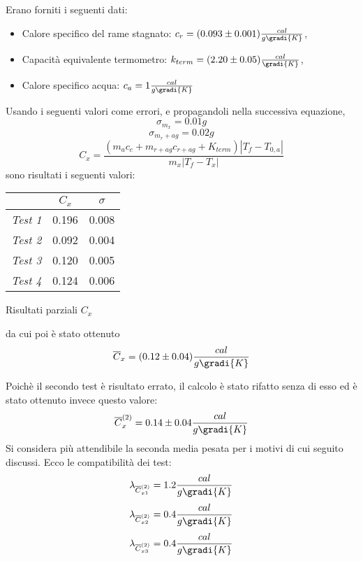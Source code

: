 Erano forniti i seguenti dati:
\begin{itemize}
 \item Calore specifico del rame stagnato: $c_r = (0.093 \pm  0.001) \frac{cal}{g \gradi{K}}$,
 \item Capacità equivalente termometro: $k_{term} = (2.20 \pm 0.05) \frac{cal}{\gradi{K}}$,
 \item Calore specifico acqua: $c_a = 1 \frac{cal}{g \gradi{K}}$
\end{itemize}
Usando i seguenti valori come errori, e propagandoli nella successiva equazione,
\[\sigma _{m_x} = 0.01 g \]
\[\sigma_{m_r+ag} = 0.02 g \]
\begin{equation}
 C_x = \frac{(m_a c_c + m_{r+ag} c_{r+ag} + K_{term}) |T_f - T_{0,a}|}{m_x |T_f - T_x|}
\end{equation}
sono risultati i seguenti valori:
\begin{tabella}
	\centering
	
	\begin{tabular}{ccc}
	    \toprule
	    & $C_x$ & $\sigma$  \\ \midrule
	    \emph{Test 1} & 0.196 & 0.008  \\ \midrule
	    \emph{Test 2} & 0.092 & 0.004  \\ \midrule
	    \emph{Test 3} & 0.120 & 0.005  \\ \midrule
	    \emph{Test 4} & 0.124 & 0.006  \\ 
	    \bottomrule
	\end{tabular}
	
	\caption{Risultati parziali $C_x$}
	\label{tab:ad}
\end{tabella}
da cui poi è stato ottenuto
\begin{equation}
\overline{C}_x = (0.12 \pm 0.04) \frac{cal}{g \gradi{K}}
\end{equation}

Poichè il secondo test è risultato errato, il calcolo è stato rifatto senza di esso ed è stato ottenuto invece questo valore:
\begin{equation}
  \overline{C}_x^{(2)} = 0.14 \pm 0.04 \frac{cal}{g \gradi{K}}
\end{equation}
Si considera più attendibile la seconda media pesata per i motivi di cui seguito discussi.
Ecco le compatibilità dei test:
\[\lambda_{\overline{C}^{(2)}_{x1}} = 1.2 \frac{cal}{g \gradi{K}} \]
\[\lambda_{\overline{C}^{(2)}_{x2}} = 0.4 \frac{cal}{g \gradi{K}} \]
\[\lambda_{\overline{C}^{(2)}_{x3}} = 0.4 \frac{cal}{g \gradi{K}} \]

